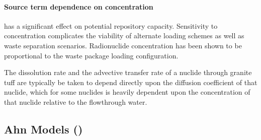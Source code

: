 \paragraph{Source term dependence on concentration} has a significant effect on potential repository 
capacity. Sensitivity to concentration complicates the viability of alternate loading schemes as 
well as waste separation scenarios. Radionuclide concentration has been shown to be proportional to 
the waste package loading configuration.\cite{ahn_relationship_2002,kawasaki_congruent_2004}

The dissolution rate and the advective transfer rate of a nuclide through granite tuff are 
typically be taken to depend directly upon the diffusion coefficient of that nuclide, which for some 
nuclides is heavily dependent upon the concentration of that nuclide relative to the flowthrough 
water. 

\subsection{Ahn Models (\cite{ahn_environmental_2004, ahn_environmental_2007})}
